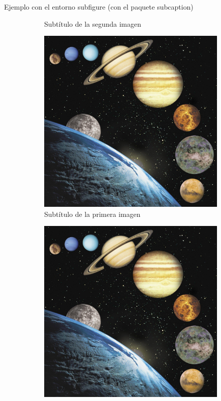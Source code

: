 \documentclass[aspectratio=169, 10pt]{beamer}
\begin{document}
\begin{frame}{Ejemplo con el entorno subfigure (con el paquete subcaption)}
\begin{figure}[H]
\begin{subfigure}{0.45\textwidth}
        \caption{Subtítulo de la segunda imagen}
        \label{fig:sub2}
    \end{subfigure}
    \begin{subfigure}{0.45\textwidth} %
        \centering
        \includegraphics[scale=0.05]{astronomia.jpg} 
        \caption{Subtítulo de la primera imagen}
        \label{fig:sub1}
    \end{subfigure}
    \hfill
    \begin{subfigure}{0.45\textwidth}
        \centering
        \includegraphics[scale=0.05]{astronomia.jpg} 

\end{subfigure}
\end{figure}
\end{frame}
\end{document}
